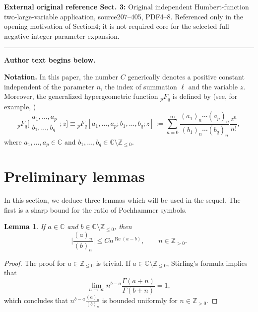 \documentclass[11pt]{article}
\numberwithin{equation}{section}
\numberwithin{equation}{section}
\newtheorem{Lemma}[Theorem]{Lemma}
\newcommand{\CC}{\ensuremath{\mathbb{C}}}
\newcommand{\ZZ}{\ensuremath{\mathbb{Z}}}
\begin{document}
\noindent\textbf{External original reference Sect. 3:} Original independent Humbert-function two-large-variable application, source207–405, PDF4–8. Referenced only in the opening motivation of Section4; it is not required core for the selected full negative-integer-parameter expansion.\par
\medskip\hrule\medskip\noindent\textbf{Author text begins below.}\par
\setcounter{section}{1}\setcounter{equation}{2}
\textbf{Notation.}
In this paper, the number $C$ generically denotes a positive constant independent of the parameter $n$, the index of summation $\ell$ and the variable $z$. Moreover, the generalized hypergeometric function $_pF_q$ is defined by (see, for example, \cite[p.~404]{NIST-Handbook})
	\begin{equation}\label{pFq definition}
		{}_pF_q\bigg[\begin{matrix}
			a_1,\dots,a_p\\
			b_1,\dots,b_q
		\end{matrix};z\bigg]
		\equiv
		{}_pF_q[
		a_1,\dots,a_p;
		b_1,\dots,b_q;z]
		:=\sum_{n=0}^{\infty}\frac{(a_1)_n\cdots(a_p)_n}{(b_1)_n\cdots(b_q)_n}\frac{z^n}{n!},
	\end{equation}
	where $a_1,\dots,a_p\in\CC$ and $b_1,\dots,b_q\in\CC\setminus\ZZ_{\leqslant 0}$.

\section{Preliminary lemmas}\label{Sect. 2}
In this section, we deduce three lemmas which will be used in the sequel. The first is a sharp bound for the ratio of Pochhammer symbols.
\begin{Lemma}\label{Lemma: ratio of Pochhammer symbol}
	If $a\in\CC$ and $b\in\CC\setminus\ZZ_{\leqslant 0}$, then
	\[\biggl|\frac{(a)_n}{(b)_n}\biggr|\leqslant Cn^{\operatorname{Re}(a-b)},\qquad n\in\ZZ_{>0}.\]
\end{Lemma}
\begin{proof}
	The proof for $a\in\ZZ_{\leqslant 0}$ is trivial. If $a\in\CC\setminus\ZZ_{\leqslant 0}$, Stirling's formula implies that
		\[\lim_{n\to\infty}n^{b-a}\frac{\Gamma(a+n)}{\Gamma(b+n)}=1,\]
		which concludes that $n^{b-a}\frac{(a)_n}{(b)_n}$ is bounded uniformly for $n\in\ZZ_{>0}$.
\end{proof}
\end{document}
